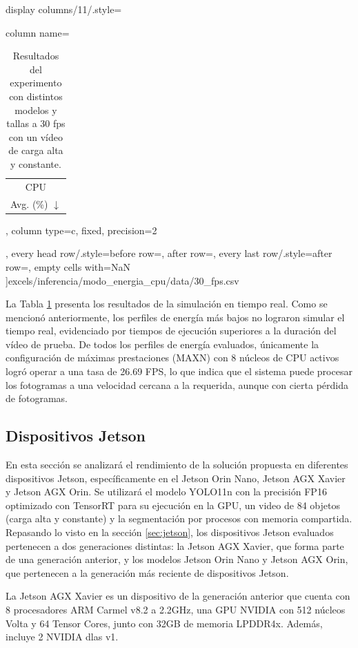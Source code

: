 \documentclass[11pt,spanish,listoffigures,listoftables]{tfgetsinf}
\begin{document}
\begin{table}[H]
{         display columns/11/.style={column name=\begin{tabular}[c]{@{}c@{}}CPU \\ Avg. (\%) $\downarrow$\end{tabular}, column type={c}, fixed, precision=2},
         every head row/.style={before row=\toprule, after row=\midrule},
         every last row/.style={after row=\bottomrule},
         empty cells with={NaN}
         ]{excels/inferencia/modo_energia_cpu/data/30_fps.csv}
         }
         \caption[Resultados del experimento con distintos modelos y tallas a 30 fps con un vídeo de carga alta y constante]{Resultados del experimento con distintos modelos y tallas a 30 fps con un vídeo de carga alta y constante.}
         \label{tab:experimento_modo_energia_cpu_30_fps}
      \end{table}

      La Tabla \ref{tab:experimento_modo_energia_cpu_30_fps} presenta los resultados de la simulación en tiempo real. Como se mencionó anteriormente, los perfiles de energía más bajos no lograron simular el tiempo real, evidenciado por tiempos de ejecución superiores a la duración del vídeo de prueba. De todos los perfiles de energía evaluados, únicamente la configuración de máximas prestaciones (MAXN) con 8 núcleos de CPU activos logró operar a una tasa de 26.69 FPS, lo que indica que el sistema puede procesar los fotogramas a una velocidad cercana a la requerida, aunque con cierta pérdida de fotogramas.



\subsection{Dispositivos Jetson} \label{sec:dispositivos_jetson}
En esta sección se analizará el rendimiento de la solución propuesta en diferentes dispositivos Jetson, específicamente en el Jetson Orin Nano, Jetson AGX Xavier  y Jetson AGX Orin. Se utilizará el modelo YOLO11n con la precisión FP16 optimizado con TensorRT para su ejecución en la GPU, un video de 84 objetos (carga alta y constante) y la segmentación por procesos con memoria compartida.
Repasando lo visto en la sección \ref{sec:jetson}, los dispositivos Jetson evaluados pertenecen a dos generaciones distintas: la Jetson AGX Xavier, que forma parte de una generación anterior, y los modelos Jetson Orin Nano y Jetson AGX Orin, que pertenecen a la generación más reciente de dispositivos Jetson.

La Jetson AGX Xavier es un dispositivo de la generación anterior que cuenta con 8 procesadores ARM Carmel v8.2 a 2.2GHz, una GPU NVIDIA con 512 núcleos Volta y 64 Tensor Cores, junto con 32GB de memoria LPDDR4x. Además, incluye 2 NVIDIA \glspl{dla} v1.
\end{document}
